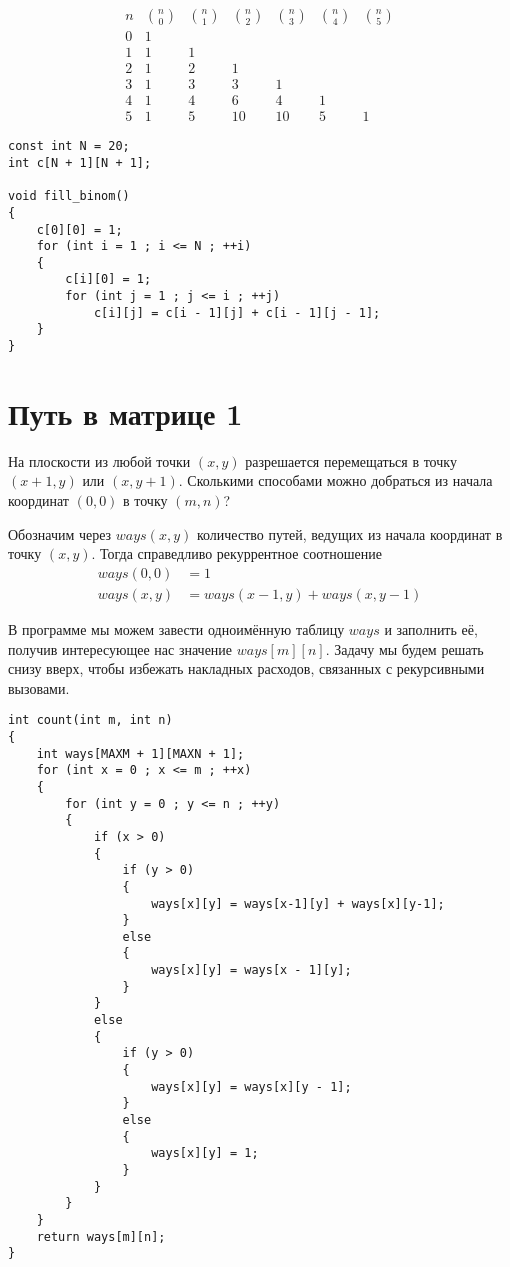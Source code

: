 \documentclass[14pt,openany]{book}
\begin{document}
$$
 \begin{array}{ccccccc}
 n & \binom{n}{0} & \binom{n}{1} & \binom{n}{2} & \binom{n}{3} & \binom{n}{4} & \binom{n}{5} \\
 0 & 1 \\
 1 & 1 & 1 \\
 2 &  1 & 2 & 1 \\
 3 & 1 & 3 & 3 & 1 \\
 4 & 1 & 4 & 6 & 4 & 1 \\
 5 & 1 & 5 & 10 & 10 & 5 & 1
 \end{array}
$$

\begin{lstlisting}
const int N = 20;
int c[N + 1][N + 1];

void fill_binom()
{
    c[0][0] = 1;
    for (int i = 1 ; i <= N ; ++i)
    {
        c[i][0] = 1;
        for (int j = 1 ; j <= i ; ++j)
            c[i][j] = c[i - 1][j] + c[i - 1][j - 1];
    }
}
\end{lstlisting}

\section{Путь в матрице 1}

На плоскости из любой точки $(x, y)$ разрешается перемещаться в точку $(x+1,y)$ или $(x,y+1)$.
Сколькими способами можно добраться из начала координат $(0,0)$ в точку $(m,n)$?

Обозначим через $ways(x,y)$ количество путей, ведущих из начала координат в точку $(x,y)$.
Тогда справедливо рекуррентное соотношение
\begin{align*}
ways(0,0) &= 1 \\
ways(x,y) &= ways(x-1,y) + ways(x,y-1)
\end{align*}

В программе мы можем завести одноимённую таблицу $ways$ и заполнить её, получив интересующее
нас значение $ways[m][n]$. Задачу мы будем решать снизу вверх, чтобы избежать накладных
расходов, связанных с рекурсивными вызовами.

\begin{lstlisting}
int count(int m, int n)
{
    int ways[MAXM + 1][MAXN + 1];
    for (int x = 0 ; x <= m ; ++x)
    {
        for (int y = 0 ; y <= n ; ++y)
        {
            if (x > 0)
            {
                if (y > 0)
	            {
                    ways[x][y] = ways[x-1][y] + ways[x][y-1];
	            }
                else
                {
                    ways[x][y] = ways[x - 1][y];
                }
            }
            else
            {
                if (y > 0)
                {
                    ways[x][y] = ways[x][y - 1];
                }
                else
                {
                    ways[x][y] = 1;
                }
            }
        }
    }
    return ways[m][n];
}
\end{lstlisting}
\end{document}

